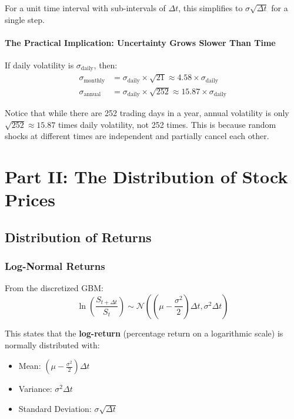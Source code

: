 \documentclass[12pt,a4paper]{article}
\begin{document}
For a unit time interval with sub-intervals of $\Delta t$, this simplifies to $\sigma \sqrt{\Delta t}$ for a single step.

\paragraph{The Practical Implication: Uncertainty Grows Slower Than Time}

\begin{tcolorbox}[colback=red!10, colframe=red!50, title=Scaling of Uncertainty]
If daily volatility is $\sigma_{\text{daily}}$, then:
\begin{align}
\sigma_{\text{monthly}} &= \sigma_{\text{daily}} \times \sqrt{21} \approx 4.58 \times \sigma_{\text{daily}} \\
\sigma_{\text{annual}} &= \sigma_{\text{daily}} \times \sqrt{252} \approx 15.87 \times \sigma_{\text{daily}}
\end{align}

Notice that while there are 252 trading days in a year, annual volatility is only $\sqrt{252} \approx 15.87$ times daily volatility, not 252 times. This is because random shocks at different times are independent and partially cancel each other.
\end{tcolorbox}

\newpage

\section{Part II: The Distribution of Stock Prices}

\subsection{Distribution of Returns}

\subsubsection{Log-Normal Returns}

From the discretized GBM:
\begin{equation}
\ln\left(\frac{S_{t+\Delta t}}{S_t}\right) \sim \mathcal{N}\left(\left(\mu - \frac{\sigma^2}{2}\right)\Delta t, \sigma^2 \Delta t\right)
\end{equation}

This states that the \textbf{log-return} (percentage return on a logarithmic scale) is normally distributed with:
\begin{itemize}
    \item Mean: $\left(\mu - \frac{\sigma^2}{2}\right)\Delta t$
    \item Variance: $\sigma^2 \Delta t$
    \item Standard Deviation: $\sigma \sqrt{\Delta t}$
\end{itemize}
\end{document}
